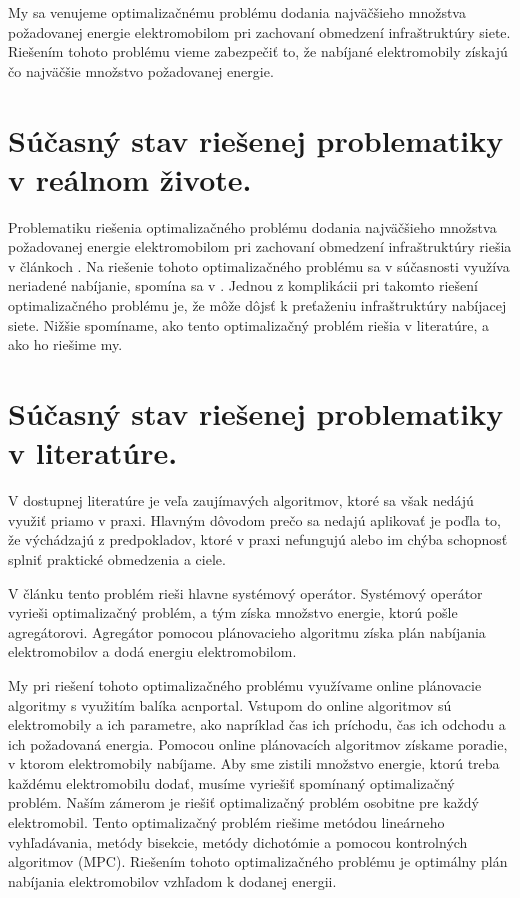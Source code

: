 My sa venujeme optimalizačnému problému dodania najväčšieho množstva požadovanej energie elektromobilom pri zachovaní obmedzení infraštruktúry siete. Riešením tohoto problému vieme zabezpečiť to, že nabíjané elektromobily získajú čo najväčšie množstvo požadovanej energie. 






\section{Súčasný stav riešenej problematiky v reálnom živote.}


Problematiku riešenia optimalizačného problému dodania najväčšieho množstva požadovanej energie elektromobilom pri zachovaní obmedzení infraštruktúry riešia v článkoch \cite{lee2021adaptivephd,Li_2021,chen2021smoothed}. 
Na riešenie tohoto optimalizačného problému sa v súčasnosti využíva neriadené nabíjanie, spomína sa v \cite{lee2021acnsim}. Jednou z komplikácii pri takomto riešení optimalizačného problému je, že môže dôjsť k preťaženiu infraštruktúry nabíjacej siete. Nižšie spomíname, ako tento optimalizačný problém riešia v literatúre, a ako ho riešime my. \cite{lee2021acnsim}


\section{Súčasný stav riešenej problematiky v literatúre.}

V dostupnej literatúre je veľa zaujímavých algoritmov, ktoré sa však nedájú využiť priamo v praxi. Hlavným dôvodom prečo sa nedajú aplikovať je poďla \cite{lee2021adaptivephd} to, že výchádzajú z predpokladov, ktoré v praxi nefungujú alebo im chýba schopnosť splniť praktické obmedzenia a ciele. 

V článku \cite{Li_2021} tento problém rieši hlavne systémový operátor. Systémový operátor vyrieši optimalizačný problém, a tým získa množstvo energie, ktorú pošle agregátorovi.  Agregátor pomocou plánovacieho algoritmu získa plán nabíjania elektromobilov a dodá energiu elektromobilom.



My pri riešení tohoto optimalizačného problému využívame online plánovacie algoritmy s využitím balíka acnportal. Vstupom do online algoritmov sú elektromobily a ich parametre, ako napríklad čas ich príchodu, čas ich odchodu a ich požadovaná energia. Pomocou online plánovacích algoritmov získame poradie, v ktorom elektromobily nabíjame. Aby sme zistili množstvo energie, ktorú treba každému elektromobilu dodať, musíme vyriešiť spomínaný optimalizačný problém. Naším zámerom je riešiť optimalizačný problém osobitne pre každý elektromobil. Tento optimalizačný problém riešime metódou lineárneho vyhľadávania, metódy bisekcie, metódy dichotómie a pomocou kontrolných algoritmov (MPC). Riešením tohoto optimalizačného problému je optimálny plán nabíjania elektromobilov vzhľadom k dodanej energii.

